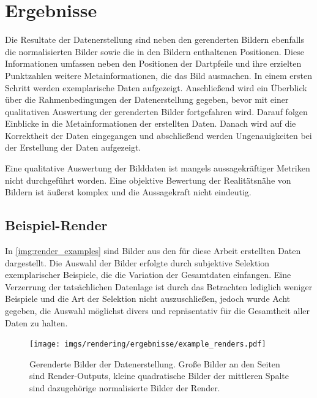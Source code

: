 
\section{Ergebnisse}
\label{sec:daten:ergebnisse}

Die Resultate der Datenerstellung sind neben den gerenderten Bildern ebenfalls die normalisierten Bilder sowie die in den Bildern enthaltenen Positionen. Diese Informationen umfassen neben den Positionen der Dartpfeile und ihre erzielten Punktzahlen weitere Metainformationen, die das Bild ausmachen. In einem ersten Schritt werden exemplarische Daten aufgezeigt. Anschließend wird ein Überblick über die Rahmenbedingungen der Datenerstellung gegeben, bevor mit einer qualitativen Auswertung der gerenderten Bilder fortgefahren wird. Darauf folgen Einblicke in die Metainformationen der erstellten Daten. Danach wird auf die Korrektheit der Daten eingegangen und abschließend werden Ungenauigkeiten bei der Erstellung der Daten aufgezeigt.

Eine qualitative Auswertung der Bilddaten ist mangels aussagekräftiger Metriken nicht durchgeführt worden. Eine objektive Bewertung der Realitätsnähe von Bildern ist äußerst komplex und die Aussagekraft nicht eindeutig.

\subsection{Beispiel-Render}  %
\label{sec:render_beispiel}

In \autoref{img:render_examples} sind Bilder aus den für diese Arbeit erstellten Daten dargestellt. Die Auswahl der Bilder erfolgte durch subjektive Selektion exemplarischer Beispiele, die die Variation der Gesamtdaten einfangen. Eine Verzerrung der tatsächlichen Datenlage ist durch das Betrachten lediglich weniger Beispiele und die Art der Selektion nicht auszuschließen, jedoch wurde Acht gegeben, die Auswahl möglichst divers und repräsentativ für die Gesamtheit aller Daten zu halten.

\begin{figure}
    \centering
    \texttt{[image: imgs/rendering/ergebnisse/example\_renders.pdf]}
    \caption{Gerenderte Bilder der Datenerstellung. Große Bilder an den Seiten sind Render-Outputs, kleine quadratische Bilder der mittleren Spalte sind dazugehörige normalisierte Bilder der Render.}
    \label{img:render_examples}
\end{figure}

